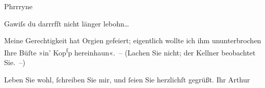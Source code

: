 \pstart
           Phrrryne{\dotstwo}\pend
           
\pstart
           Gawiſs {\dotstwo} du darrrfſt nicht länger lebohn{\dots}\pend
           
\pstart
           Meine Gerechtigkeit hat Orgien {\pb}gefeiert; eigentlich
               wollte ich ihm ununterbrochen Ihre Büſte »in’  Kop\substVorne{}\textsuperscript{f}\substDazwischen{}p\substHinten{} hereinhaun«. – (Lachen Sie nicht; der Kellner beobachtet Sie. –)\pend
           
\pstart
           Leben Sie wohl, ſchreiben Sie mir, und ſeien Sie herzlichſt gegrüßt.\pend
           \pstart Ihr \spacefill\mbox{Arthur}\pend{}\endnumbering{}  
      